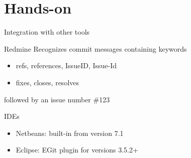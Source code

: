 \documentclass{beamer}
\begin{document}

\section{Hands-on}

\begin{frame}{Integration with other tools}
  \begin{block}{Redmine}
    Recognizes commit messages containing keywords
    \begin{itemize}
    \item refs, references, IssueID, Issue-Id
    \item fixes, closes, resolves
    \end{itemize}
    followed by an issue number \#123
  \end{block}
  \begin{block}{IDEs}
    \begin{itemize}
    \item Netbeans: built-in from version 7.1
    \item Eclipse: EGit plugin for versions 3.5.2+
    \end{itemize}
  \end{block}
\end{frame}
\end{document}
